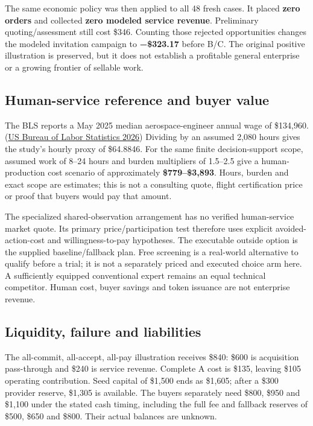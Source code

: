 \documentclass[11pt,letterpaper]{article}
\begin{document}
The same economic policy was then applied to all 48 fresh cases. It
placed \textbf{zero orders} and collected \textbf{zero modeled service
revenue}. Preliminary quoting/assessment still cost \$346. Counting
those rejected opportunities changes the modeled invitation campaign to
\textbf{−\$323.17} before B/C. The original positive illustration is
preserved, but it does not establish a profitable general enterprise or
a growing frontier of sellable work.

\hypertarget{human-service-reference-and-buyer-value}{%
\subsection{Human-service reference and buyer
value}\label{human-service-reference-and-buyer-value}}

The BLS reports a May 2025 median aerospace-engineer annual wage of
\$134,960. (\protect\hyperlink{ref-bls2026}{US Bureau of Labor
Statistics 2026}) Dividing by an assumed 2,080 hours gives the study's
hourly proxy of \$64.8846. For the same finite decision-support scope,
assumed work of 8--24 hours and burden multipliers of 1.5--2.5 give a
human-production cost scenario of approximately \textbf{\$779--\$3,893}.
Hours, burden and exact scope are estimates; this is not a consulting
quote, flight certification price or proof that buyers would pay that
amount.

The specialized shared-observation arrangement has no verified
human-service market quote. Its primary price/participation test
therefore uses explicit avoided-action-cost and willingness-to-pay
hypotheses. The executable outside option is the supplied
baseline/fallback plan. Free screening is a real-world alternative to
qualify before a trial; it is not a separately priced and executed
choice arm here. A sufficiently equipped conventional expert remains an
equal technical competitor. Human cost, buyer savings and token issuance
are not enterprise revenue.

\hypertarget{liquidity-failure-and-liabilities}{%
\subsection{Liquidity, failure and
liabilities}\label{liquidity-failure-and-liabilities}}

The all-commit, all-accept, all-pay illustration receives \$840: \$600
is acquisition pass-through and \$240 is service revenue. Complete A
cost is \$135, leaving \$105 operating contribution. Seed capital of
\$1,500 ends as \$1,605; after a \$300 provider reserve, \$1,305 is
available. The buyers separately need \$800, \$950 and \$1,100 under the
stated cash timing, including the full fee and fallback reserves of
\$500, \$650 and \$800. Their actual balances are unknown.
\end{document}
